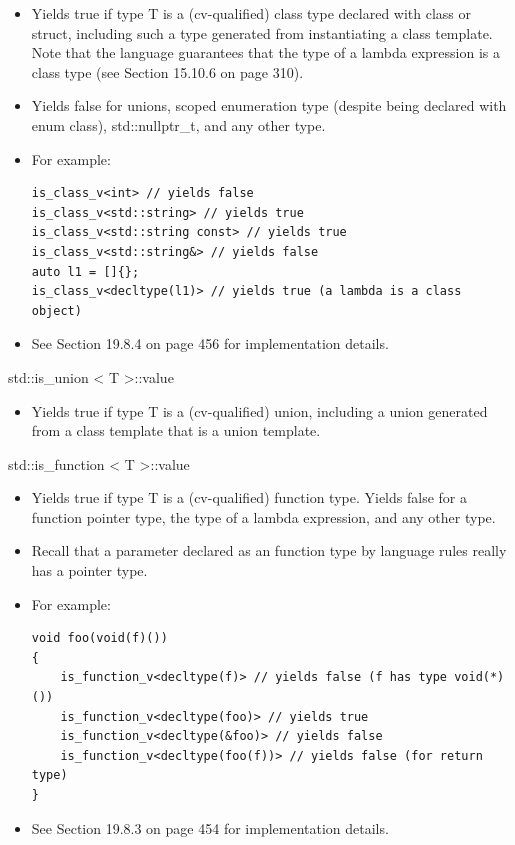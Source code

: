 \begin{itemize}
\item 
Yields true if type T is a (cv-qualified) class type declared with class or struct, including such a type generated from instantiating a class template. Note that the language guarantees that the type of a lambda expression is a class type (see Section 15.10.6 on page 310).

\item 
Yields false for unions, scoped enumeration type (despite being declared with enum class), std::nullptr\_t, and any other type.

\item 
For example:
\begin{lstlisting}[style=styleCXX]
is_class_v<int> // yields false
is_class_v<std::string> // yields true
is_class_v<std::string const> // yields true
is_class_v<std::string&> // yields false
auto l1 = []{};
is_class_v<decltype(l1)> // yields true (a lambda is a class object)
\end{lstlisting}

\item 
See Section 19.8.4 on page 456 for implementation details.
\end{itemize}

std::is\_union < T >::value

\begin{itemize}
\item 
Yields true if type T is a (cv-qualified) union, including a union generated from a class template that is a union template.
\end{itemize}

std::is\_function < T >::value

\begin{itemize}
\item 
Yields true if type T is a (cv-qualified) function type. Yields false for a function pointer type, the type of a lambda expression, and any other type.

\item 
Recall that a parameter declared as an function type by language rules really has a pointer type.

\item 
For example:
\begin{lstlisting}[style=styleCXX]
void foo(void(f)())
{
	is_function_v<decltype(f)> // yields false (f has type void(*)())
	is_function_v<decltype(foo)> // yields true
	is_function_v<decltype(&foo)> // yields false
	is_function_v<decltype(foo(f))> // yields false (for return type)
}
\end{lstlisting}

\item 
See Section 19.8.3 on page 454 for implementation details.
\end{itemize}

